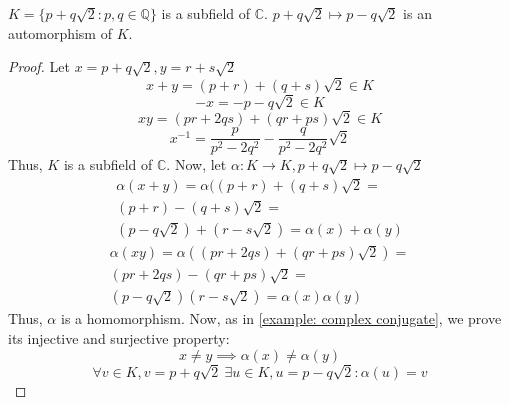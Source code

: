 \begin{examples}
\begin{example}
    $K = \{p + q\sqrt{2} : p,q \in \mathbb{Q}\}$ is a subfield of $\mathbb{C}$.
    $p + q\sqrt{2} \mapsto p - q\sqrt{2}$ is an automorphism of $K$.
\end{example}
\begin{proof}
    Let $x = p + q\sqrt{2},y = r + s\sqrt{2}$
    \[x + y = (p + r) + (q + s)\sqrt{2} \in K\]
    \[-x = -p - q\sqrt{2} \in K\]
    \[xy = (pr + 2qs) + (qr + ps)\sqrt{2} \in K\]
    \[x^{-1} = \frac{p}{p^2 - 2q^2} - \frac{q}{p^2 - 2q^2}\sqrt{2}\]
    Thus, $K$ is a subfield of $\mathbb{C}$. Now, let $\alpha : K \to K,p + q\sqrt{2} \mapsto p - q\sqrt{2}$
    \begin{equation*}
    \begin{split}
        \alpha(x + y) = \alpha((p + r) + (q + s)\sqrt{2} =\\
        (p + r) - (q + s)\sqrt{2} =\\
        (p - q\sqrt{2}) + (r - s\sqrt{2}) = \alpha(x) + \alpha(y)
    \end{split}
    \end{equation*}
    \begin{equation*}
    \begin{split}
        \alpha(xy) = \alpha((pr + 2qs) + (qr + ps)\sqrt{2}) =\\
        (pr + 2qs) - (qr + ps)\sqrt{2} =\\
        (p - q\sqrt{2})(r - s\sqrt{2}) = \alpha(x)\alpha(y)
    \end{split}
    \end{equation*}
    Thus, $\alpha$ is a homomorphism. Now, as in \cref{example: complex conjugate}, we prove its injective and surjective property:
    \[x \neq y \implies \alpha(x) \neq \alpha(y)\]
    \[\forall v \in K,v = p + q\sqrt{2} \ \exists u \in K,u = p - q\sqrt{2} : \alpha(u) = v\]
\end{proof}
\end{examples}